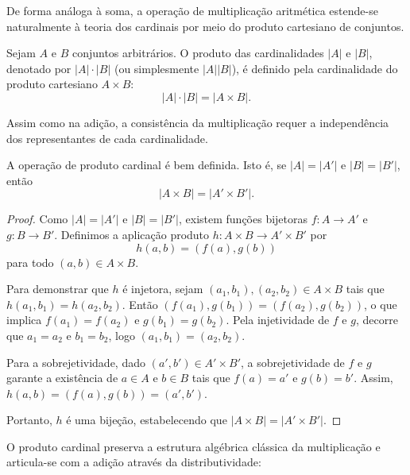 De forma análoga à soma, a operação de multiplicação aritmética estende-se naturalmente à teoria dos cardinais por meio do produto cartesiano de conjuntos.

\begin{definicao}
    \label{def:produto_cardinal}
    Sejam \(A\) e \(B\) conjuntos arbitrários. O produto das cardinalidades \(|A|\) e \(|B|\), denotado por \(|A| \cdot |B|\) (ou simplesmente \(|A||B|\)), é definido pela cardinalidade do produto cartesiano \(A \times B\):
    \[
        |A| \cdot |B| = |A \times B|.
    \]
\end{definicao}

Assim como na adição, a consistência da multiplicação requer a independência dos representantes de cada cardinalidade.

\begin{lema}
    \label{lem:produto_cardinal_bem_definido}
    A operação de produto cardinal é bem definida. Isto é, se \(|A| = |A'|\) e \(|B| = |B'|\), então
    \[
        |A \times B| = |A' \times B'|.
    \]
\end{lema}

\begin{proof}
    Como \(|A| = |A'|\) e \(|B| = |B'|\), existem funções bijetoras \(f: A \to A'\) e \(g: B \to B'\). Definimos a aplicação produto \(h: A \times B \to A' \times B'\) por
    \[
        h(a, b) = (f(a), g(b))
    \]
    para todo \((a, b) \in A \times B\).

    Para demonstrar que \(h\) é injetora, sejam \((a_1, b_1), (a_2, b_2) \in A \times B\) tais que \(h(a_1, b_1) = h(a_2, b_2)\). Então \((f(a_1), g(b_1)) = (f(a_2), g(b_2))\), o que implica \(f(a_1) = f(a_2)\) e \(g(b_1) = g(b_2)\). Pela injetividade de \(f\) e \(g\), decorre que \(a_1 = a_2\) e \(b_1 = b_2\), logo \((a_1, b_1) = (a_2, b_2)\).

    Para a sobrejetividade, dado \((a', b') \in A' \times B'\), a sobrejetividade de \(f\) e \(g\) garante a existência de \(a \in A\) e \(b \in B\) tais que \(f(a) = a'\) e \(g(b) = b'\). Assim, \(h(a, b) = (f(a), g(b)) = (a', b')\).

    Portanto, \(h\) é uma bijeção, estabelecendo que \(|A \times B| = |A' \times B'|\).
\end{proof}

O produto cardinal preserva a estrutura algébrica clássica da multiplicação e articula-se com a adição através da distributividade:

